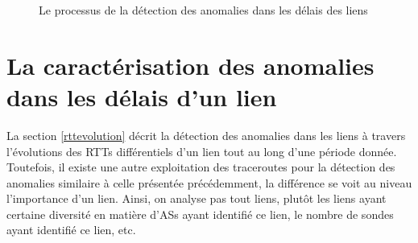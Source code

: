 \begin{figure}[h]
	\centering
	\resizebox{\textwidth}{\textheight}{
		
	}
	\caption{Le processus de la détection des anomalies dans les délais des liens}
	\label{fig:process-rttanalysis_tex}
\end{figure}



\section{La caractérisation des anomalies dans les délais d'un lien}
La section \ref{rttevolution} décrit la détection des anomalies dans les liens à travers l'évolutions des RTTs différentiels d'un lien tout au long d'une période donnée. Toutefois, il existe une autre exploitation des traceroutes pour la détection des anomalies similaire à celle présentée précédemment, la différence se voit au niveau l'importance d'un lien. Ainsi, on analyse pas tout liens, plutôt les liens ayant certaine diversité en matière d'ASs ayant identifié ce lien, le nombre de sondes ayant identifié ce lien, etc. 
